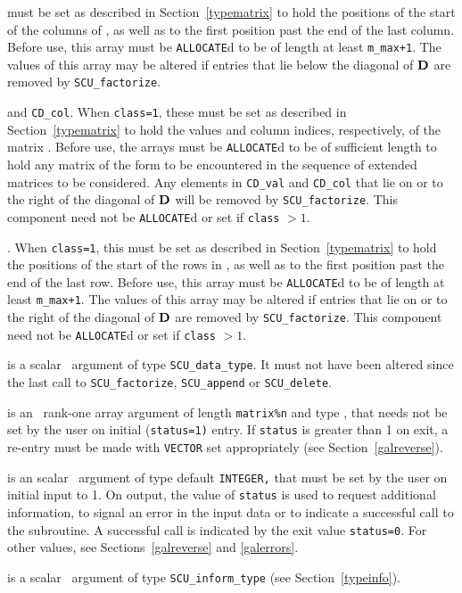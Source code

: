 \documentclass{galahad}
\newcommand{\packagename}{SCU}
\begin{document}
\begin{description}
\begin{description}
 must be set as described in Section~\ref{typematrix}
to hold the 
positions of the start of the columns of , as well as to the first 
position past the end of the last column. 
Before use, this array must be {\tt ALLOCATE}d to be of length at least 
{\tt m\_max+1}. 
The values of this array may be altered if entries that lie 
below the diagonal of ${\mathbf{D}}$ are removed by {\tt \packagename\_factorize}. 
 
 and {\tt CD\_col}.   
When {\tt class=1}, 
these must be set as described in Section~\ref{typematrix} to hold the 
values and column indices, respectively, of the matrix .  
Before use, the arrays must be {\tt ALLOCATE}d 
to be of sufficient length to hold any matrix of the form  
to be encountered in the sequence of 
extended matrices to be considered. Any elements in 
{\tt CD\_val} and {\tt CD\_col} 
that lie on or to the right of the diagonal of ${\mathbf{D}}$ will be removed by  
{\tt \packagename\_factorize}. 
This component need not be {\tt ALLOCATE}d or set if {\tt class} $> 1$. 
 
. When {\tt class=1}, 
this must be set as described in Section~\ref{typematrix} to hold the 
positions of the start of the rows in , as well as to the first 
position past the end of the last row. 
Before use, this array must be {\tt ALLOCATE}d to be of length at least 
{\tt m\_max+1}. 
The values of this array may be altered if entries that lie on or to the 
right of the diagonal of ${\mathbf{D}}$ are removed by {\tt \packagename\_factorize}. 
This component need not be {\tt ALLOCATE}d or set if {\tt class} $> 1$. 
 
\end{description} 
 
 is a scalar \intentinout\ argument of type 
{\tt \packagename\_data\_type}. 
It must not have been altered since the last call to  
{\tt \packagename\_factorize}, 
{\tt \packagename\_append} or 
{\tt \packagename\_delete}. 
 
 is an \intentinout\ rank-one array argument of length 
{\tt matrix\%n} 
and type \realdp, 
that needs not be set by 
the user on initial ({\tt status=1)} entry. If {\tt status} is greater than 
1 on exit, a re-entry must be made with {\tt VECTOR} set appropriately 
(see Section~\ref{galreverse}). 
 
 is an scalar \intentinout\ argument of type 
default {\tt INTEGER,} that  
must be set by the user on initial input to 1. On output, the value of 
{\tt status} 
is used to request additional information, to signal an error 
in the input data or to indicate a successful call to the subroutine. 
A successful call is indicated by the exit value {\tt status=0}. 
For other values, see Sections~\ref{galreverse} and \ref{galerrors}. 
 
 is a scalar \intentinout\ argument of type 
{\tt \packagename\_inform\_type} 
(see Section~\ref{typeinfo}). 
 
\end{description}
\end{document}
